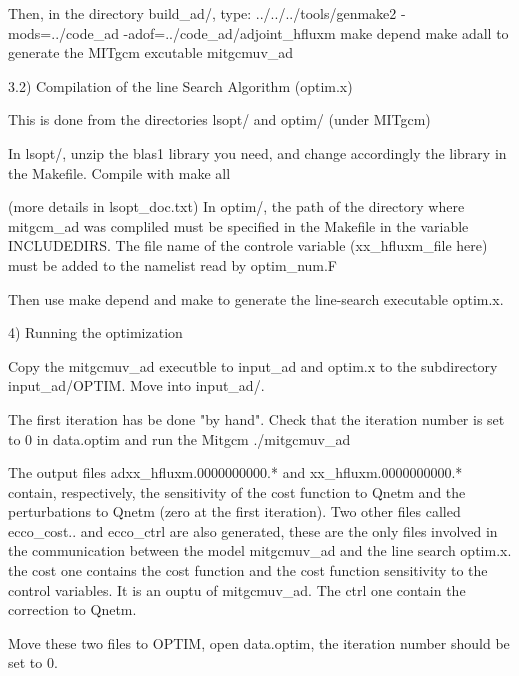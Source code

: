 Then, in the directory build\_ad/, type:
../../../tools/genmake2 -mods=../code\_ad -adof=../code\_ad/adjoint\_hfluxm
make depend
make adall
to generate the MITgcm excutable mitgcmuv\_ad


3.2) Compilation of the line Search Algorithm (optim.x)

This is done from the directories lsopt/ and optim/ (under MITgcm)

In lsopt/, unzip the blas1 library you need, and change accordingly the
library in the Makefile. Compile with make all

(more details in lsopt\_doc.txt)
In optim/,  the path of the directory where mitgcm\_ad was compliled must be specified
in the Makefile in the variable INCLUDEDIRS. The file name of the controle variable
(xx\_hfluxm\_file here) must be added to the namelist read by optim\_num.F

Then use make depend and make to generate the line-search executable optim.x.

4) Running the optimization

Copy the mitgcmuv\_ad executble to input\_ad and optim.x to the subdirectory
input\_ad/OPTIM. Move into input\_ad/.


The first iteration has be done "by hand". 
Check that the iteration number is set to 0 in data.optim and run the Mitgcm
./mitgcmuv\_ad

The output files adxx\_hfluxm.0000000000.* and xx\_hfluxm.0000000000.* contain,
respectively, the sensitivity of the cost function to Qnetm and the perturbations
to Qnetm (zero at the first iteration). Two other files called ecco\_cost.. and
ecco\_ctrl are also generated, 
these are the only files involved in the communication between the model mitgcmuv\_ad and
the line search optim.x. the cost one contains the cost function and the cost function
sensitivity to the control variables. It is an ouptu of mitgcmuv\_ad. The ctrl one contain the correction to Qnetm.

Move these two files to OPTIM, open data.optim, the iteration number should be
set to 0. 
